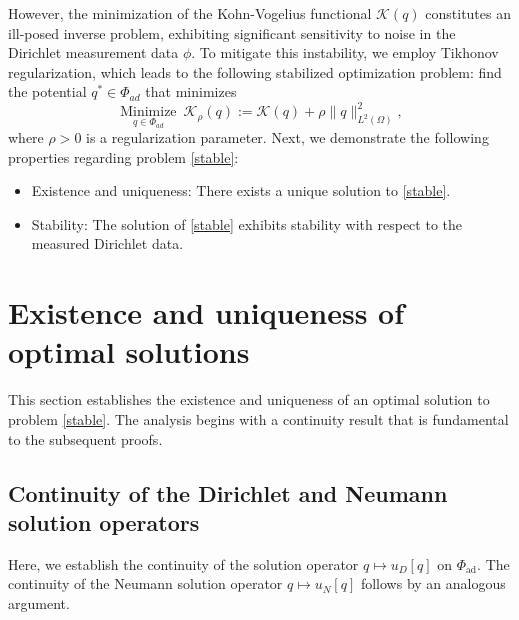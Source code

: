 \documentclass[a4paper,12pt,reqno,natbib]{amsart}
\begin{document}
However, the minimization of the Kohn-Vogelius functional $\mathcal{K}(q)$ constitutes an ill-posed inverse problem, exhibiting significant sensitivity to noise in the Dirichlet measurement data $\phi$. To mitigate this instability, we employ Tikhonov regularization, which leads to the following stabilized optimization problem: find the potential $q^* \in \Phi_{ad}$ that minimizes
\begin{equation}\label{stable} 
    \displaystyle\operatorname*{Minimize}_{q\in\Phi_{ad}}\
\mathcal{K}_\rho( q):=\mathcal{K}( q)+\rho\|q\|^2_{L^2(\Omega)},
\end{equation}
where $\rho>0$ is a regularization parameter. Next, we demonstrate the following properties regarding problem \eqref{stable}:
\begin{itemize}
    \item[(i)] Existence and uniqueness: There exists a unique solution to \eqref{stable}.
\item[(ii)] Stability: The solution of \eqref{stable} exhibits stability with respect to the measured Dirichlet data.
\end{itemize}









\section{Existence and uniqueness of optimal solutions}\label{sec:6}

This section establishes the existence and uniqueness of an optimal solution to problem \eqref{stable}. The analysis begins with a continuity result that is fundamental to the subsequent proofs.




\subsection{Continuity of the Dirichlet and Neumann solution operators}


Here, we establish the continuity of the solution operator \( q \longmapsto u_D[q] \) on \( \Phi_{\text{ad}} \). The continuity of the Neumann solution operator \( q \longmapsto u_N[q] \) follows by an analogous argument.
\end{document}
